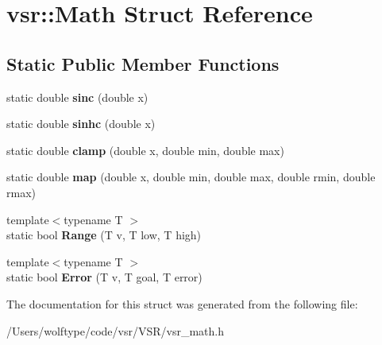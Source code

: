 \hypertarget{structvsr_1_1_math}{\section{vsr\-:\-:Math Struct Reference}
\label{structvsr_1_1_math}
}
\subsection*{Static Public Member Functions}
\begin{DoxyCompactItemize}
\item 
\hypertarget{structvsr_1_1_math_ae710a7a91f08f043008621d066368223}{static double {\bfseries sinc} (double x)}\label{structvsr_1_1_math_ae710a7a91f08f043008621d066368223}

\item 
\hypertarget{structvsr_1_1_math_a39453cecbc47dc251256b103d5c5dbf5}{static double {\bfseries sinhc} (double x)}\label{structvsr_1_1_math_a39453cecbc47dc251256b103d5c5dbf5}

\item 
\hypertarget{structvsr_1_1_math_a0c1fcf5a042dc7e404dadc274cceba16}{static double {\bfseries clamp} (double x, double min, double max)}\label{structvsr_1_1_math_a0c1fcf5a042dc7e404dadc274cceba16}

\item 
\hypertarget{structvsr_1_1_math_a56e7e25e1bd2bd41b677153e2a89093a}{static double {\bfseries map} (double x, double min, double max, double rmin, double rmax)}\label{structvsr_1_1_math_a56e7e25e1bd2bd41b677153e2a89093a}

\item 
\hypertarget{structvsr_1_1_math_a3c18590c58ad88d9cb4ae900043145f6}{{\footnotesize template$<$typename T $>$ }\\static bool {\bfseries Range} (T v, T low, T high)}\label{structvsr_1_1_math_a3c18590c58ad88d9cb4ae900043145f6}

\item 
\hypertarget{structvsr_1_1_math_a311cbb3a83047972a9f21a2601282fba}{{\footnotesize template$<$typename T $>$ }\\static bool {\bfseries Error} (T v, T goal, T error)}\label{structvsr_1_1_math_a311cbb3a83047972a9f21a2601282fba}

\end{DoxyCompactItemize}


The documentation for this struct was generated from the following file\-:\begin{DoxyCompactItemize}
\item 
/\-Users/wolftype/code/vsr/\-V\-S\-R/vsr\-\_\-math.\-h\end{DoxyCompactItemize}
